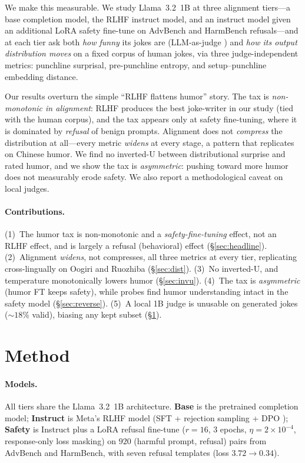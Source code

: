 \documentclass{article}
\begin{document}
We make this measurable. We study Llama~3.2~1B \citep{dubey2024llama3} at three alignment tiers---a base completion model, the RLHF instruct model, and an instruct model given an additional LoRA \citep{hu2022lora} safety fine-tune on AdvBench \citep{zou2023gcg} and HarmBench \citep{mazeika2024harmbench} refusals---and at each tier ask both \emph{how funny} its jokes are (LLM-as-judge \citep{zheng2023judging}) and \emph{how its output distribution moves} on a fixed corpus of human jokes, via three judge-independent metrics: punchline surprisal, pre-punchline entropy, and setup--punchline embedding distance.

Our results overturn the simple ``RLHF flattens humor'' story. The tax is \emph{non-monotonic in alignment}: RLHF produces the best joke-writer in our study (tied with the human corpus), and the tax appears only at safety fine-tuning, where it is dominated by \emph{refusal} of benign prompts. Alignment does not \emph{compress} the distribution at all---every metric \emph{widens} at every stage, a pattern that replicates on Chinese humor. We find no inverted-U between distributional surprise and rated humor, and we show the tax is \emph{asymmetric}: pushing toward more humor does not measurably erode safety. We also report a methodological caveat on local judges.

\paragraph{Contributions.} (1)~The humor tax is non-monotonic and a \emph{safety-fine-tuning} effect, not an RLHF effect, and is largely a refusal (behavioral) effect (\S\ref{sec:headline}). (2)~Alignment \emph{widens}, not compresses, all three metrics at every tier, replicating cross-lingually on Oogiri and Ruozhiba (\S\ref{sec:dist}). (3)~No inverted-U, and temperature monotonically lowers humor (\S\ref{sec:invu}). (4)~The tax is \emph{asymmetric} (humor FT keeps safety), while probes find humor understanding intact in the safety model (\S\ref{sec:reverse}). (5)~A local 1B judge is unusable on generated jokes ($\sim$$18\%$ valid), biasing any kept subset (\S\ref{sec:method}).


\section{Method}
\label{sec:method}

\paragraph{Models.} All tiers share the Llama~3.2~1B architecture. \textbf{Base} is the pretrained completion model; \textbf{Instruct} is Meta's RLHF model (SFT + rejection sampling + DPO \citep{rafailov2023dpo}); \textbf{Safety} is Instruct plus a LoRA refusal fine-tune ($r{=}16$, 3 epochs, $\eta=2\times10^{-4}$, response-only loss masking) on $920$ (harmful prompt, refusal) pairs from AdvBench and HarmBench, with seven refusal templates (loss $3.72\to0.34$).
\end{document}
